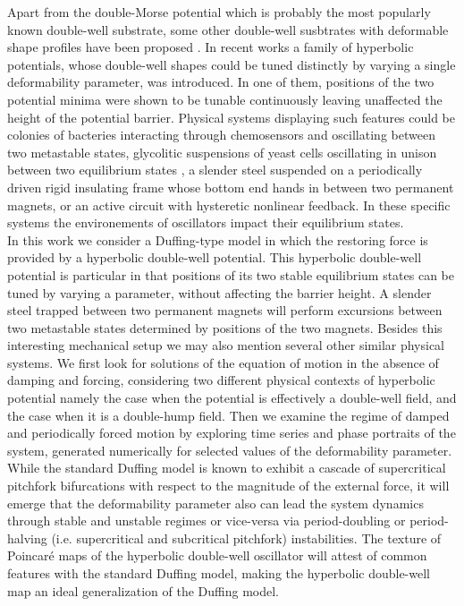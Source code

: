 \documentclass[%
 aip,
cha,
 amsmath,amssymb,
preprint,
]{revtex4-2}
\begin{document}
Apart from the double-Morse potential \cite{a16} which is probably the most popularly known double-well substrate, some other double-well susbtrates with deformable shape profiles have been proposed \cite{a17,a18,a19,a20}. In recent works \cite{a21,a22,a23} a family of hyperbolic potentials, whose double-well shapes could be tuned distinctly by varying a single deformability parameter, was introduced. In one of them, positions of the two potential minima were shown to be tunable continuously leaving unaffected the height of the potential barrier. Physical systems displaying such features could be colonies of bacteries interacting through chemosensors and oscillating between two metastable states, glycolitic suspensions
of yeast cells oscillating in unison between two equilibrium states \cite{a24}, a slender steel suspended on a periodically driven rigid insulating frame whose bottom end hands in between two permanent magnets, or an active circuit with hysteretic nonlinear feedback. In these specific systems the environements of oscillators impact their equilibrium states. \\
In this work we consider a Duffing-type model in which the restoring force is provided by a hyperbolic double-well potential. This hyperbolic double-well potential is particular in that positions of its two stable equilibrium states can be tuned by varying a parameter, without affecting the barrier height. A slender steel trapped between two permanent magnets will perform excursions between two metastable states determined by positions of the two magnets. Besides this interesting mechanical setup we may also mention several other similar physical systems. We first look for solutions of the equation of motion in the absence of damping and forcing, considering two different physical contexts of hyperbolic potential namely the case when the potential is effectively a double-well field, and the case when it is a double-hump field. Then we examine the regime of damped and periodically forced motion by exploring time series and phase portraits of the system, generated numerically for selected values of the deformability parameter. While the standard Duffing model is known to exhibit a cascade of supercritical pitchfork bifurcations with respect to the magnitude of the external force, it will emerge that the deformability parameter also can lead the system dynamics through stable and unstable regimes or vice-versa via period-doubling or period-halving (i.e. supercritical and subcritical pitchfork) instabilities. The texture of Poincar\'e maps of the hyperbolic double-well oscillator will attest of common features with the standard Duffing model, making the hyperbolic double-well map an ideal generalization of the Duffing model.
\end{document}
